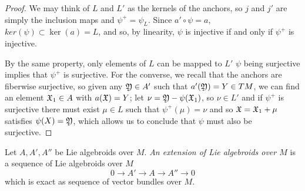 \begin{proof}
We may think of $L$ and $L'$ as the kernels of the anchors, so $j$ and $j'$ are simply the inclusion maps and $\psi^+ = \psi_L$. Since $a' \circ \psi = a$, $ker(\psi) \subset \ker(a) = L$, and so, by linearity, $\psi$ is injective if and only if $\psi^+$ is injective.

By the same property, only elements of $L$ can be mapped to $L'$ $\psi$ being surjective implies that $\psi^+$ is surjective. For the converse, we recall that the anchors are fiberwise surjective, so given any $\mathfrak{Y} \in A'$ such that $a'(\mathfrak{Y}) = Y \in TM$, we can find an element $\mathfrak{X}_1 \in A$ with $a(\mathfrak{X}) = Y$; let $\nu = \mathfrak{Y} - \psi(\mathfrak{X}_1)$, so $\nu \in L'$ and if $\psi^+$ is surjective there must exist $\mu \in L$ such that $\psi^+(\mu) = \nu$ and so $\mathfrak{X} = \mathfrak{X}_1 + \mu$ satisfies $\psi(X) = \mathfrak{Y}$, which allows us to conclude that $\psi$ must also be surjective.
\end{proof}


\linea

\begin{definition} 
Let $A, A', A''$ be Lie algebroids over $M$. \emph{An extension of Lie algebroids over $M$} is a sequence of Lie algebroids over $M$ \[ 0 \to A' \to A \to A'' \to 0 \] which is exact as sequence of vector bundles over $M$.
\end{definition}










